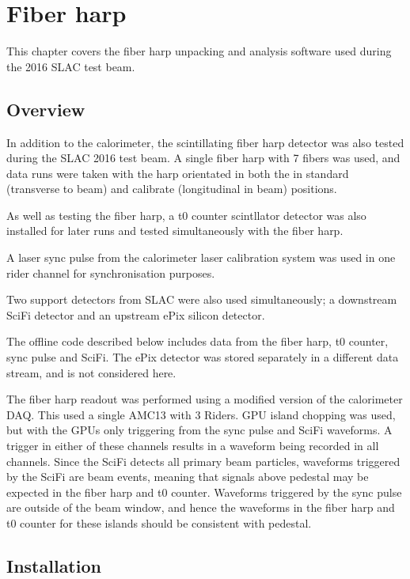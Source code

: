 \chapter{Fiber harp}
\label{chap:fiberharp}

This chapter covers the fiber harp unpacking and analysis software used during the 2016 SLAC test beam.

\section{Overview}

In addition to the calorimeter, the scintillating fiber harp detector was also tested during the SLAC 2016 test beam. A single fiber harp with 7 fibers was used, and data runs were taken with the harp orientated in both the in standard (transverse to beam) and calibrate (longitudinal in beam) positions. 

As well as testing the fiber harp, a t0 counter scintllator detector was also installed for later runs and tested simultaneously with the fiber harp.

A laser sync pulse from the calorimeter laser calibration system was used in one rider channel for synchronisation purposes.

Two support detectors from SLAC were also used simultaneously; a downstream SciFi detector and an upstream ePix silicon detector. 

The offline code described below includes data from the fiber harp, t0 counter, sync pulse and SciFi. The ePix detector was stored separately in a different data stream, and is not considered here. 

The fiber harp readout was performed using a modified version of the calorimeter DAQ. This used a single AMC13 with 3 Riders. GPU island chopping was used, but with the GPUs only triggering from the sync pulse and SciFi waveforms. A trigger in either of these channels results in a waveform being recorded in all channels. Since the SciFi detects all primary beam particles, waveforms triggered by the SciFi are beam events, meaning that signals above pedestal may be expected in the fiber harp and t0 counter. Waveforms triggered by the sync pulse are outside of the beam window, and hence the waveforms in the fiber harp and t0 counter for these islands should be consistent with pedestal.

\section{Installation}

